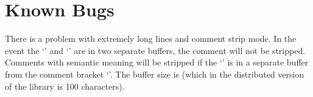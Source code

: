 \section{Known Bugs}
There is a problem with extremely long lines and comment strip mode.
In the event the `\code{(}' and `\code{*}' are in two separate buffers,
the comment will not be stripped.  Comments with semantic meaning will
be stripped if the `\code{\$}' is in a separate buffer from the comment
bracket `\code{(*}'.  The buffer size is 
 (which in the distributed version of
the library is 100 characters).
